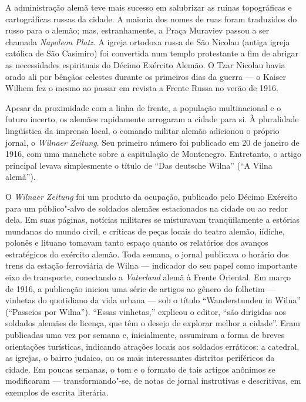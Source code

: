 A administração alemã teve mais sucesso em salubrizar as ruínas
topográficas e cartográficas russas da cidade. A maioria dos nomes de
ruas foram traduzidos do russo para o alemão; mas, estranhamente, a
Praça Muraviev passou a ser chamada \emph{Napoleon Platz}. A igreja
ortodoxa russa de São Nicolau (antiga igreja católica de São Casimiro)
foi convertida num templo protestante a fim de abrigar as necessidades
espirituais do Décimo Exército Alemão. O Tzar Nicolau  havia orado ali
por bênçãos celestes durante os primeiros dias da guerra --- o Kaiser
Wilhem  fez o mesmo ao passar em revista a Frente Russa no verão de
1916.

\asterisc

Apesar da proximidade com a linha de frente, a população multinacional e
o futuro incerto, os alemães rapidamente arrogaram a cidade para si. À
pluralidade lingüística da imprensa local, o comando militar alemão
adicionou o próprio jornal, o \emph{Wilnaer Zeitung}. Seu primeiro
número foi publicado em 20 de janeiro de 1916, com uma manchete sobre a
capitulação de Montenegro. Entretanto, o artigo principal levava
simplesmente o título de ``Das deutsche Wilna'' (``A Vilna alemã'').

O \emph{Wilnaer Zeitung} foi um produto da ocupação, publicado pelo
Décimo Exército para um público"-alvo de soldados alemães estacionados na
cidade ou ao redor dela. Em suas páginas, notícias militares se
misturavam tranqüilamente a estórias mundanas do mundo civil, e críticas
de peças locais do teatro alemão, iídiche, polonês e lituano tomavam
tanto espaço quanto os relatórios dos avanços estratégicos do exército
alemão. Toda semana, o jornal publicava o horário dos trens da estação
ferroviária de Wilna --- indicador do seu papel como importante eixo de
transporte, conectando a \emph{Vaterland} alemã à Frente Oriental. Em
março de 1916, a publicação iniciou uma série de artigos ao gênero do
folhetim --- vinhetas do quotidiano da vida urbana --- sob o título
``Wanderstunden in Wilna'' (``Passeios por Wilna''). ``Essas vinhetas,''
explicou o editor, ``são dirigidas aos soldados alemães de licença, que
têm o desejo de explorar melhor a cidade''. Eram publicadas uma vez por
semana e, inicialmente, assumiram a forma de breves orientações
turísticas, indicando atrações locais aos soldados erráticos: a
catedral, as igrejas, o bairro judaico, ou os mais interessantes
distritos periféricos da cidade. Em poucas semanas, o tom e o formato de
tais artigos anônimos se modificaram --- transformando"-se, de notas de
jornal instrutivas e descritivas, em exemplos de escrita literária.

